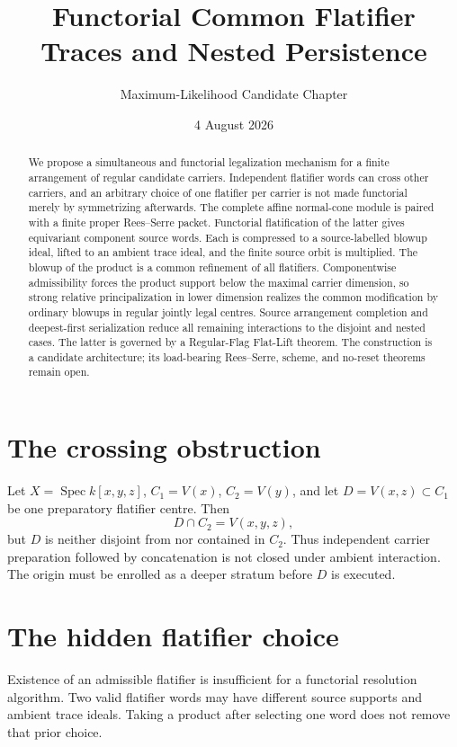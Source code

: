 \documentclass[11pt]{amsart}
\title{Functorial Common Flatifier Traces and Nested Persistence}
\author{Maximum-Likelihood Candidate Chapter}
\date{4 August 2026}
\begin{document}
\maketitle

\begin{abstract}
We propose a simultaneous and functorial legalization mechanism for a finite
arrangement of regular candidate carriers.  Independent flatifier words can
cross other carriers, and an arbitrary choice of one flatifier per carrier is
not made functorial merely by symmetrizing afterwards.  The complete affine
normal-cone module is paired with a finite proper Rees--Serre packet.  Functorial
flatification of the latter gives equivariant component source words.  Each is
compressed to a source-labelled blowup ideal, lifted to an ambient trace ideal,
and the finite source orbit is multiplied.  The blowup of the product is a
common refinement of all flatifiers.  Componentwise admissibility forces the
product support below the maximal carrier dimension, so strong relative
principalization in lower dimension realizes the common modification by
ordinary blowups in regular jointly legal centres.  Source arrangement
completion and deepest-first serialization reduce all remaining interactions
to the disjoint and nested cases.  The latter is governed by a Regular-Flag
Flat-Lift theorem.  The construction is a candidate architecture; its
load-bearing Rees--Serre, scheme, and no-reset theorems remain open.
\end{abstract}

\section{The crossing obstruction}
Let $X=\operatorname{Spec}k[x,y,z]$, $C_1=V(x)$, $C_2=V(y)$, and let
$D=V(x,z)\subset C_1$ be one preparatory flatifier centre.  Then
\[
 D\cap C_2=V(x,y,z),
\]
but $D$ is neither disjoint from nor contained in $C_2$.  Thus independent
carrier preparation followed by concatenation is not closed under ambient
interaction.  The origin must be enrolled as a deeper stratum before $D$ is
executed.

\section{The hidden flatifier choice}
Existence of an admissible flatifier is insufficient for a functorial
resolution algorithm.  Two valid flatifier words may have different source
supports and ambient trace ideals.  Taking a product after selecting one word
does not remove that prior choice.
\end{document}
